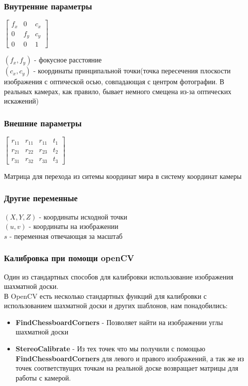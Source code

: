 \documentclass{beamer}
\begin{document}
		\begin{frame}
			\frametitle{Внутренние параметры}
			\begin{center}
			$
			\begin{bmatrix}
			f_{x}&0&c_{x}\\
			0&f_{y}&c_{y}\\
			0&0&1
			\end{bmatrix}
			$
			\end{center}
			$(f_{x},f_{y})$ - фокусное расстояние\\
			$(c_{x},c_{y})$ - координаты принципальной точки(точка пересечения плоскости изображения с оптической осью, совпадающая с центром фотографии. В реальных камерах, как правило, бывает немного смещена из-за оптических искажений)
		\end{frame}				
		\begin{frame}
			\frametitle{Внешние параметры}
			\begin{center}
			$
			\begin{bmatrix}
			r_{11}&r_{11}&r_{11}&t_{1}\\
			r_{21}&r_{22}&r_{23}&t_{2}\\
			r_{31}&r_{32}&r_{33}&t_{3}
			\end{bmatrix}
			$
			\end{center}
			Матрица для перехода из ситемы координат мира в систему координат камеры
		\end{frame}				
		\begin{frame}
			\frametitle{Другие переменные}
			$(X,Y,Z)$ - координаты исходной точки\\
			$(u,v)$ - координаты на изображении\\
			$s$ - переменная отвечающая за масштаб
		\end{frame}
		\begin{frame}
			\frametitle{Калибровка при помощи openCV}
			Один из стандартных способов для калибровки использование изображения шахматной доски.\\
			В OpenCV есть несколько стандартных функций для калибровки с использованием шахматной доски и других шаблонов, нам понадобились:
			\begin{itemize}
				\item \textbf{FindChessboardCorners} - Позволяет найти на изображении углы шахматной доски
				\item \textbf{StereoCalibrate} - Из тех точек что мы получили с помощью \textbf{FindChessboardCorners} для левого и правого изображений, а так же из точек соответствущих точкам на реальной доске возвращает матрицы для работы с камерой.
			\end{itemize}
		\end{frame}
\end{document}
